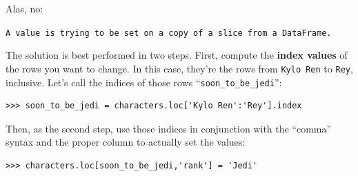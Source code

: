 Alas, no:

\quad \texttt{A value is trying to be set on a copy of a slice from a DataFrame.}
\bigskip

The solution is best performed in two steps. First, compute the \textbf{index
values} of the rows you want to change. In this case, they're the rows from
\texttt{Kylo Ren} to \texttt{Rey}, inclusive. Let's call the indices of those
rows ``\texttt{soon\_to\_be\_jedi}'':

\begin{Verbatim}[fontsize=\small,samepage=true,frame=single]
>>> soon_to_be_jedi = characters.loc['Kylo Ren':'Rey'].index
\end{Verbatim}

Then, as the second step, use those indices in conjunction with the ``comma''
syntax and the proper column to actually set the values:

\begin{Verbatim}[fontsize=\small,samepage=true,frame=single]
>>> characters.loc[soon_to_be_jedi,'rank'] = 'Jedi'
\end{Verbatim}


